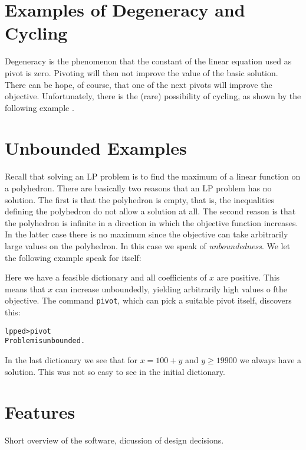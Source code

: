 \documentclass[ukenglish]{nik}
\begin{document}
\section{Examples of Degeneracy and Cycling}\label{sec:cycling}
Degeneracy is the phenomenon that the constant of the linear equation used as pivot
is zero. Pivoting will then not improve the value of the basic solution. 
There can be hope, of course, that one of the next pivots will improve
the objective. Unfortunately, there is the (rare) possibility of cycling,
as shown by the following example \cite{Chvatal,Vanderbei}.
\begin{alltt}

\end{alltt}

\section{Unbounded Examples}\label{sec:unbounded}
Recall that solving an LP problem is to find the maximum of a linear
function on a polyhedron. There are basically two reasons that
an LP problem has no solution. The first is that the polyhedron is
empty, that is, the inequalities defining the polyhedron do not allow
a solution at all. The second reason is that the polyhedron is
infinite in a direction in which the objective function increases.
In the latter case there is no maximum since the objective can
take arbitrarily large values on the polyhedron. In this case we
speak of \emph{unboundedness}. We let the following example
speak for itself:
\begin{alltt}

\end{alltt}
Here we have a feasible dictionary and all coefficients of $x$ are
positive. This means that $x$ can increase unboundedly,
yielding arbitrarily high values o fthe objective.
The command \verb|pivot|, which can pick a suitable pivot itself,
discovers this:
\begin{alltt}
lpped> pivot
Problem is unbounded.
\end{alltt}
In the last dictionary we see that for $x=100+y$ and $y \geq 19900$
we always have a solution. This was not so easy to see in the
initial dictionary. 






\section{Features}\label{sec:features}
Short overview of the software, dicussion of design decisions.
\end{document}
